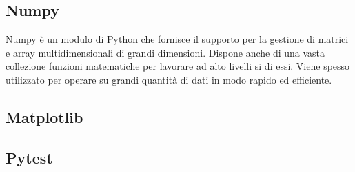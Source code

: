 \subsection{Numpy}
Numpy è un modulo di Python che fornisce il supporto per
la gestione di matrici e array multidimensionali di grandi dimensioni. Dispone anche di una vasta collezione funzioni matematiche per lavorare ad alto livelli si di essi. Viene spesso utilizzato per operare su grandi quantità di dati in modo rapido ed efficiente.
\subsection{Matplotlib}
\subsection{Pytest}